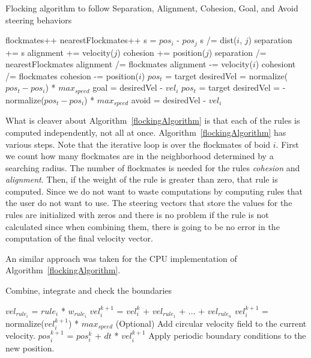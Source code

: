 \begin{algorithm}
\caption{Flocking algorithm to follow Separation, Alignment, Cohesion, Goal, and Avoid steering behaviors}
\label{flockingAlgorithm}
\begin{algorithmic}
	\STATE flockmates++
				\STATE nearestFlockmates++
				\STATE s = $pos_i$ - $pos_j$ 
				\STATE s /= dist($i$, $j$) 
				\STATE separation += s
			\ENDIF
		\ENDIF
			\STATE alignment += velocity($j$)
		\ENDIF
			\STATE cohesion += position($j$)
		\ENDIF
	\ENDIF
\ENDFOR
{}
	\STATE separation /= nearestFlockmates
\ENDIF
{}
	\STATE alignment /=  flockmates
	\STATE alignment -= velocity($i$)
\ENDIF
{}
	\STATE cohesiont /=  flockmates
	\STATE cohesion -= position($i$)
\ENDIF
{}
	\STATE $pos_t$ = target
	\STATE desiredVel = normalize($pos_t - pos_i$) * $max_{speed}$
	\STATE goal = desiredVel - $vel_i$
\ENDIF
{}
	\STATE $pos_t$ = target
	\STATE desiredVel = -normalize($pos_t - pos_i$) * $max_{speed}$
	\STATE avoid = desiredVel - $vel_i$
\ENDIF

\end{algorithmic}
\end{algorithm}

What is cleaver about Algorithm~\ref{flockingAlgorithm} is that each of the rules is computed independently, not all at once. Algorithm~\ref{flockingAlgorithm} has various steps. Note that the iterative loop is over the flockmates of boid $i$. First we count how many flockmates are in the neighborhood determined by a searching radius. The number of flockmates is needed for the rules \textit{cohesion} and \textit{alignment}. Then, if the weight of the rule is greater than zero, that rule is computed. Since we do not want to waste computations by computing rules that the user do not want to use. The steering vectors that store the values for the rules are initialized with zeros and there is no problem if the rule is not calculated since when combining them, there is going to be no error in the computation of the final velocity vector.

An similar approach was taken for the CPU implementation of Algorithm~\ref{flockingAlgorithm}.

\begin{algorithm}
\caption{Combine, integrate and check the boundaries}
\label{combineAlgorithm}
\begin{algorithmic}
\STATE $vel_{rule_i}$  = $rule_i$ * $w_{rule_i}$ 
\STATE $vel_i^{k+1}$ = $vel_i^k$ + $vel_{rule_1}$ + ... + $vel_{rule_n}$
	\STATE $vel_i^{k+1}$ = normalize($vel_i^{k+1}$) * $max_{speed}$
\ENDIF  
\STATE (Optional) Add circular velocity field to the current velocity.
\STATE $pos_i^{k+1}$ = $pos_i^{k}$ + $dt$ * $vel_i^{k+1}$
\STATE Apply periodic boundary conditions to the new position.
\end{algorithmic}
\end{algorithm}

